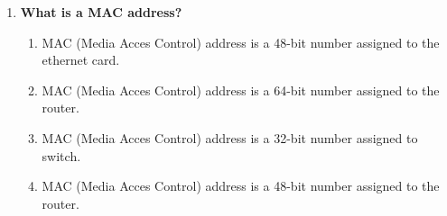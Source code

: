 \begin{flushleft}
\begin{enumerate}
		\item \textbf{What is a MAC address?}
		\begin{enumerate}[label=(\alph*)]
			\item MAC (Media Acces Control) address is a 48-bit number assigned to the ethernet card. %
			\item MAC (Media Acces Control) address is a 64-bit number assigned to the router.
			\item MAC (Media Acces Control) address is a 32-bit number assigned to switch.
			\item MAC (Media Acces Control) address is a 48-bit number assigned to the router.
		\end{enumerate}
		
	\end{enumerate}
	
	
\end{flushleft}

\newpage

